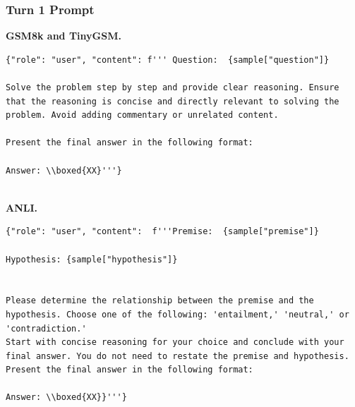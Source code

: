 \subsubsection{Turn 1 Prompt}
\textbf{GSM8k and TinyGSM. }
\begin{lstlisting}[breaklines=true]
{"role": "user", "content": f''' Question:  {sample["question"]}

Solve the problem step by step and provide clear reasoning. Ensure that the reasoning is concise and directly relevant to solving the problem. Avoid adding commentary or unrelated content.

Present the final answer in the following format:

Answer: \\boxed{XX}'''}
   
\end{lstlisting}
\vspace{2cm}
\textbf{ANLI. }
\begin{lstlisting}[breaklines=true]
{"role": "user", "content":  f'''Premise:  {sample["premise"]}

Hypothesis: {sample["hypothesis"]}


Please determine the relationship between the premise and the hypothesis. Choose one of the following: 'entailment,' 'neutral,' or 'contradiction.'
Start with concise reasoning for your choice and conclude with your final answer. You do not need to restate the premise and hypothesis. Present the final answer in the following format:

Answer: \\boxed{XX}}'''}
\end{lstlisting}

